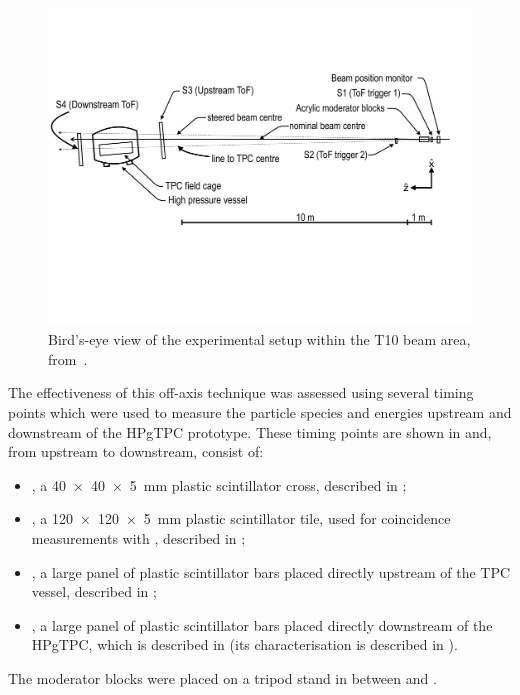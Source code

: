 \begin{figure}[h]
  \centering
  \includegraphics[width=\linewidth]{files/figures/hptpc_beam_flux/hptpc_t10_planview}
  \caption[Bird's-eye view of the experimental setup within the T10 beam area]{Bird's-eye view of the experimental setup within the T10 beam area, from~\cite{beampaper}.}
  \label{fig:beamSetup}
\end{figure}

The effectiveness of this off-axis technique was assessed using several timing points which were used to measure the particle species and energies upstream and downstream of the HPgTPC prototype.
These timing points are shown in  and, from upstream to downstream, consist of:
\begin{itemize}
    \item \SOne, a \SI{40 x 40 x 5}{\mm} plastic scintillator cross, described in ;
    \item \STwo, a \SI{120 x 120 x 5}{\mm} plastic scintillator tile, used for coincidence measurements with \SOne, described in ;
    \item \SThree, a large panel of plastic scintillator bars placed directly upstream of the TPC vessel, described in ;
    \item \SFour, a large panel of plastic scintillator bars placed directly downstream of the HPgTPC, which is described in  (its characterisation is described in ).
\end{itemize}
The moderator blocks were placed on a tripod stand in between \SOne and \STwo.



